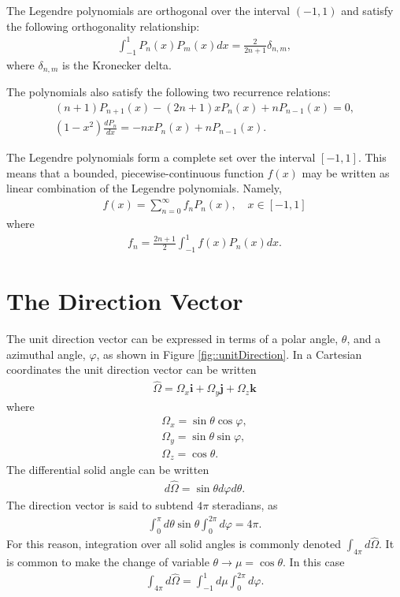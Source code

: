 \documentclass[11pt]{article}
\renewcommand\vec{\mathbf}
\begin{document}
The Legendre polynomials are orthogonal over the interval \((-1, 1)\) and satisfy the following orthogonality relationship:
\begin{align}
  \int_{-1}^1 P_n(x) P_m(x) dx = \frac{2}{2n+1} \delta_{n,m},
\end{align}
where \(\delta_{n,m}\) is the Kronecker delta.

The polynomials also satisfy the following two recurrence relations:
\begin{align}
  (n+1) P_{n+1}(x) - (2n + 1) x P_n(x) + n P_{n-1}(x) = 0, \\
  \left(1 - x^2\right) \frac{dP_n}{dx} = -n x P_n(x) + n P_{n-1}(x).
\end{align}

The Legendre polynomials form a complete set over the interval \([-1, 1]\).  This means that a bounded, piecewise-continuous function \(f(x)\) may be written as linear combination of the Legendre polynomials.  Namely,
\begin{align}
  f(x) = \sum_{n=0}^\infty f_n P_n(x), \quad x \in [-1,1]
\end{align}
where
\begin{align}
  f_n = \frac{2n+1}{2} \int_{-1}^{1} f(x) P_n(x) dx.
\end{align}
\section{The Direction Vector}
\label{sec:orgheadline8}
The unit direction vector can be expressed in terms of a polar angle, \(\theta\), and a azimuthal angle, \(\varphi\), as shown in Figure \ref{fig::unitDirection}.  In a Cartesian coordinates the unit direction vector can be written
\begin{align}
  \hat{\Omega} = \Omega_x \vec{i} + \Omega_y \vec{j} + \Omega_z \vec{k}
\end{align} 
where
\begin{subequations}
\begin{align}
  \Omega_x = \sin\theta \cos\varphi, \\
  \Omega_y = \sin\theta \sin\varphi, \\
  \Omega_z = \cos\theta.
\end{align}
\end{subequations}
The differential solid angle can be written
\begin{align}
  d\hat{\Omega} = \sin\theta d\varphi d\theta.
\end{align}
The direction vector is said to subtend \(4\pi\) steradians, as
\begin{align}
  \int_0^\pi d\theta \sin\theta \int_0^{2\pi} d\varphi = 4\pi.
\end{align}
For this reason, integration over all solid angles is commonly denoted \(\int_{4\pi} d\hat{\Omega}\).
It is common to make the change of variable \(\theta \rightarrow \mu = \cos\theta\).  In this case
\begin{align}
  \int_{4\pi} d\hat{\Omega} = \int_{-1}^1 d\mu \int_0^{2\pi} d\varphi.
\end{align}
\end{document}
